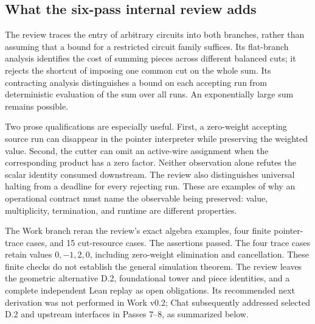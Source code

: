 \documentclass[11pt,letterpaper]{article}
\begin{document}
\subsection{What the six-pass internal review adds}
The review traces the entry of arbitrary circuits into both branches, rather than assuming that a bound for a restricted circuit family suffices. Its flat-branch analysis identifies the cost of summing pieces across different balanced cuts; it rejects the shortcut of imposing one common cut on the whole sum. Its contracting analysis distinguishes a bound on each accepting run from deterministic evaluation of the sum over all runs. An exponentially large sum remains possible.

Two prose qualifications are especially useful. First, a zero-weight accepting source run can disappear in the pointer interpreter while preserving the weighted value. Second, the cutter can omit an active-wire assignment when the corresponding product has a zero factor. Neither observation alone refutes the scalar identity consumed downstream. The review also distinguishes universal halting from a deadline for every rejecting run. These are examples of why an operational contract must name the observable being preserved: value, multiplicity, termination, and runtime are different properties.

The Work branch reran the review's exact algebra examples, four finite pointer-trace cases, and 15 cut-resource cases. The assertions passed. The four trace cases retain values $0,-1,2,0$, including zero-weight elimination and cancellation. These finite checks do not establish the general simulation theorem. The review leaves the geometric alternative D.2, foundational tower and piece identities, and a complete independent Lean replay as open obligations. Its recommended next derivation was not performed in Work v0.2; Chat subsequently addressed selected D.2 and upstream interfaces in Passes 7--8, as summarized below.\cite{internalvp}
\end{document}
